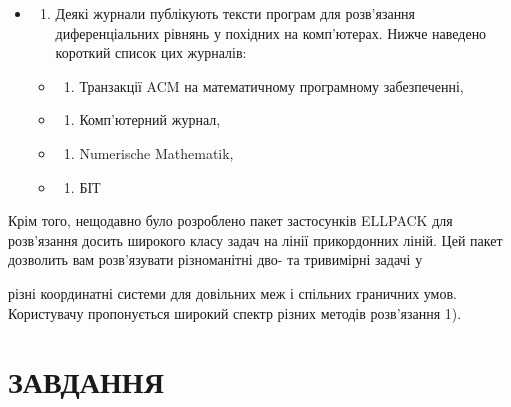 \documentclass[
  ukrainian,
]{article}
\providecommand{\tightlist}{%
  \setlength{\itemsep}{0pt}\setlength{\parskip}{0pt}}
\begin{document}
\begin{itemize}
\item
  \begin{enumerate}
  \def\labelenumi{\arabic{enumi}.}
  \setcounter{enumi}{6}
  \tightlist
  \item
    Деякі журнали публікують тексти програм для розв'язання
    диференціальних рівнянь у похідних на комп'ютерах. Нижче наведено
    короткий список цих журналів:
  \end{enumerate}

  \begin{itemize}
  \tightlist
  \item
    \begin{enumerate}
    \def\labelenumi{\alph{enumi})}
    \tightlist
    \item
      Транзакції ACM на математичному програмному забезпеченні,
    \end{enumerate}
  \item
    \begin{enumerate}
    \def\labelenumi{\arabic{enumi})}
    \setcounter{enumi}{5}
    \tightlist
    \item
      Комп'ютерний журнал,
    \end{enumerate}
  \item
    \begin{enumerate}
    \def\labelenumi{\Alph{enumi})}
    \setcounter{enumi}{1}
    \tightlist
    \item
      Numerische Mathematik,
    \end{enumerate}
  \item
    \begin{enumerate}
    \def\labelenumi{\alph{enumi})}
    \setcounter{enumi}{17}
    \tightlist
    \item
      БІТ
    \end{enumerate}
  \end{itemize}
\end{itemize}

Крім того, нещодавно було розроблено пакет застосунків ELLPACK для
розв'язання досить широкого класу задач на лінії прикордонних ліній. Цей
пакет дозволить вам розв'язувати різноманітні дво- та тривимірні задачі
у

різні координатні системи для довільних меж і спільних граничних умов.
Користувачу пропонується широкий спектр різних методів розв'язання 1).

\section{ЗАВДАННЯ}\label{ux437ux430ux432ux434ux430ux43dux43dux44f-13}
\end{document}

